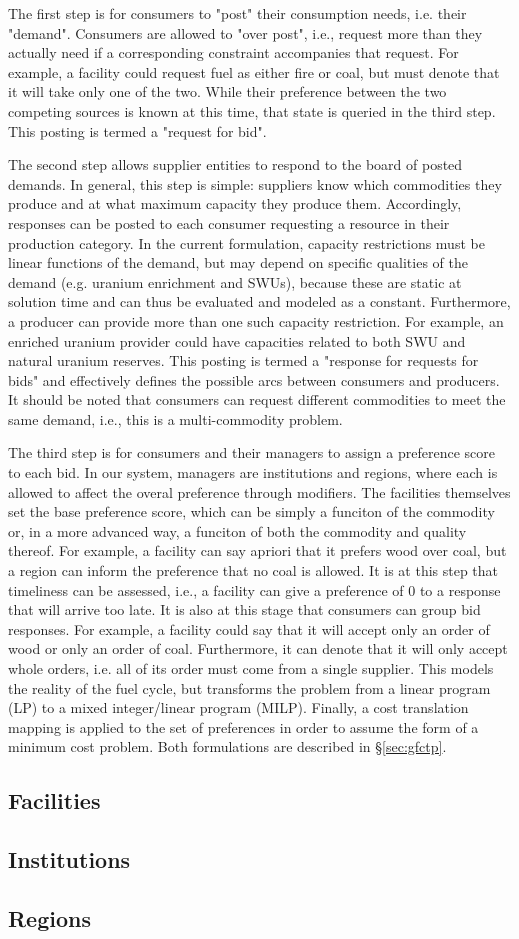 The first step is for consumers to "post" their consumption needs, i.e. their
"demand". Consumers are allowed to "over post", i.e., request more than they
actually need if a corresponding constraint accompanies that request. For
example, a facility could request fuel as either fire or coal, but must denote
that it will take only one of the two. While their preference between the two
competing sources is known at this time, that state is queried in the third
step. This posting is termed a "request for bid".

The second step allows supplier entities to respond to the board of posted
demands. In general, this step is simple: suppliers know which commodities they
produce and at what maximum capacity they produce them. Accordingly, responses
can be posted to each consumer requesting a resource in their production
category. In the current formulation, capacity restrictions must be linear
functions of the demand, but may depend on specific qualities of the demand
(e.g. uranium enrichment and SWUs), because these are static at solution time
and can thus be evaluated and modeled as a constant. Furthermore, a producer can
provide more than one such capacity restriction. For example, an enriched
uranium provider could have capacities related to both SWU and natural uranium
reserves. This posting is termed a "response for requests for bids" and
effectively defines the possible arcs between consumers and producers. It should
be noted that consumers can request different commodities to meet the same
demand, i.e., this is a multi-commodity problem.

The third step is for consumers and their managers to assign a preference score
to each bid. In our system, managers are institutions and regions, where each is
allowed to affect the overal preference through modifiers. The facilities
themselves set the base preference score, which can be simply a funciton of the
commodity or, in a more advanced way, a funciton of both the commodity and
quality thereof. For example, a facility can say apriori that it prefers wood
over coal, but a region can inform the preference that no coal is allowed. It is
at this step that timeliness can be assessed, i.e., a facility can give a
preference of 0 to a response that will arrive too late. It is also at this
stage that consumers can group bid responses. For example, a facility could say
that it will accept only an order of wood or only an order of coal. Furthermore,
it can denote that it will only accept whole orders, i.e. all of its order must
come from a single supplier. This models the reality of the fuel cycle, but
transforms the problem from a linear program (LP) to a mixed integer/linear
program (MILP). Finally, a cost translation mapping is applied to the set of
preferences in order to assume the form of a minimum cost problem. Both
formulations are described in \S\ref{sec:gfctp}.

\subsection{Facilities}
\subsection{Institutions}
\subsection{Regions}

